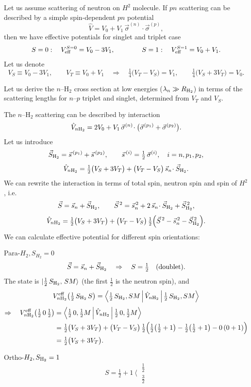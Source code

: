 \documentclass[11pt,a4paper]{article}
\newcommand{\op}[1]{\hat{#1}}
\begin{document}
Let us assume scattering of neutron on $H^2$ molecule. If $pn$ scattering can be described by a simple spin-dependent $pn$ potential
\[
\op V=V_0+V_1\,\vec\sigma^{(n)}\!\cdot\vec\sigma^{(p)} , 
\]
then we have effective potentials for singlet and triplet case 
\[
S=0:\quad V_{\rm eff}^{S=0}=V_0-3V_1,
\qquad\qquad
S=1:\quad V_{\rm eff}^{S=1}=V_0+V_1 .
\]
Let us denote
\[
V_S\equiv V_0-3V_1,\qquad V_T\equiv V_0+V_1
\quad\Rightarrow\quad
\tfrac14\big(V_T-V_S\big)=V_1,\qquad
\tfrac14\big(V_S+3V_T\big)=V_0 .
\]

Let us derive the $n$--H$_2$ cross section at low energies
($\lambda_n\gg R_{\rm H_2}$) in terms of the scattering lengths for $n$--$p$
triplet and singlet, determined from $V_T$ and $V_S$.

The $n$--H$_2$ scattering can be described by interaction
\[
\op V_{n\rm H_2}=2V_0+V_1\,\vec\sigma^{(n)}\!\cdot\big(\vec\sigma^{(p_1)}+\vec\sigma^{(p_2)}\big).
\]
Let us introduce
\[
\vec S_{\rm H_2}=\vec s^{\,(p_1)}+\vec s^{\,(p_2)},
\qquad
\vec s^{\,(i)}=\tfrac12\,\vec\sigma^{(i)},\quad i=n,p_1,p_2,
\]
\[
\op V_{n\rm H_2}=\tfrac12\big(V_S+3V_T\big)+\big(V_T-V_S\big)\,\vec s_n\!\cdot\vec S_{\rm H_2} .
\]
We can rewrite the interaction in terms of total spin, neutron spin and spin of $H^2$, i.e. 
\[
\vec S=\vec s_n+\vec S_{\rm H_2},
\qquad
\vec S^{\,2}=\vec s_n^{\,2}+2\,\vec s_n\!\cdot\vec S_{\rm H_2}+\vec S_{\rm H_2}^{\,2},
\]
\[
\op V_{n\rm H_2}=\tfrac12\big(V_S+3V_T\big)
+\big(V_T-V_S\big)\,\tfrac12\Big(\vec S^{\,2}-\vec s_n^{\,2}-\vec S_{\rm H_2}^{\,2}\Big).
\]
We can calculate effective potential for different spin orientations:

Para-$H_2, S_{H_2}=0$
\[
\vec S=\vec s_n+\vec S_{\rm H_2}\quad\Rightarrow\quad S=\tfrac12\quad\text{(doublet)}.
\]
The state is $\ket{\tfrac12\,S_{\rm H_2},\,SM}$ (the first $\tfrac12$ is the
neutron spin), and
\[
V^{\rm eff}_{n\rm H_2}\big(\tfrac12\,S_{\rm H_2}\,S\big)
=\Braket{\tfrac12\,S_{\rm H_2},SM|\op V_{n\rm H_2}|\tfrac12\,S_{\rm H_2},SM}
\]
\begin{align*}
\Rightarrow\quad
V^{\rm eff}_{n\rm H_2}\big(\tfrac12\,0\,\tfrac12\big)
&=\Braket{\tfrac12\,0,\tfrac12M|\op V_{n\rm H_2}|\tfrac12\,0,\tfrac12M}\\
&=\tfrac12\big(V_S+3V_T\big)+\big(V_T-V_S\big)\,\tfrac12\Big(\tfrac12\big(\tfrac12+1\big)
-\tfrac12\big(\tfrac12+1\big)-0\,(0+1)\Big)\\
&=\tfrac12\big(V_S+3V_T\big).
\end{align*}

Ortho-$H_2, S_{\rm H_2}=1$
\[
S=\tfrac12+1\ \Big\langle\
\begin{matrix}\tfrac12\\[1mm]\tfrac32\end{matrix}
\]
\end{document}
